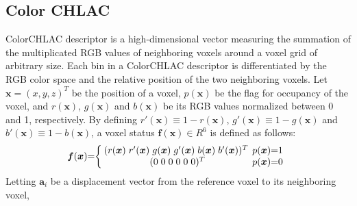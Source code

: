 \documentclass[conference]{sty/IEEEtran}
\begin{document}
\subsection{Color CHLAC}
\label{sec:color_chlac}
ColorCHLAC descriptor is a high-dimensional vector measuring the summation of the 
multiplicated RGB values of neighboring voxels around a voxel grid of arbitrary size. 
Each bin in a ColorCHLAC descriptor is differentiated by the RGB color space and the 
relative position of the two neighboring voxels. 
Let $\bm{x}=(x,y,z)^T$ be the position of a voxel, $p(\bm{x})$ be the flag for occupancy 
of the voxel, and $r(\bm{x})$, $g(\bm{x})$ and $b(\bm{x})$ be its RGB values normalized 
between 0 and 1, respectively.  By defining 
$r'(\bm{x}) \equiv 1 - r(\bm{x})$, $g'(\bm{x}) \equiv 1 - g(\bm{x})$ and $b'(\bm{x}) \equiv 1 - b(\bm{x})$, 
a voxel status $\bm{f}(\bm{x})\in R^6$ is defined as follows: 
\begin{eqnarray}
  \label{eq:voxel}
  \bm{f}({\bm x})\hspace{-1mm}=\hspace{-1mm}\left\{
  \begin{array}{cc}
    \hspace{-1mm}
    (r({\bm x})\hspace{1mm} r'({\bm x}) \hspace{1mm}g({\bm x}) \hspace{1mm}g'({\bm x}) \hspace{1mm}b({\bm x}) \hspace{1mm}b'({\bm x}))^T & \hspace{-2mm}p({\bm x})\hspace{-1mm}=\hspace{-1mm}1 \\
    (0\hspace{1mm}0\hspace{1mm}0\hspace{1mm}0\hspace{1mm}0\hspace{1mm}0)^T & \hspace{-2mm}p({\bm x})\hspace{-1mm}=\hspace{-1mm}0
  \end{array}\right.
\end{eqnarray}
%
Letting ${\bm a_i}$ be a displacement vector from the reference voxel to its neighboring voxel, 
\end{document}
